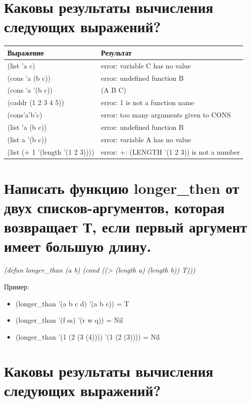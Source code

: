 \documentclass[a4paper,12pt]{article}
\begin{document}
	\section{Каковы результаты вычисления следующих выражений?}
	
	\begin{table} [h!]
		\begin{center}
			\begin{tabular}{|l|l|}
				\hline
				{\bf  Выражение} &    {\bf Результат} \\
				\hline
				{(list 'a c)} & error: variable C has no value\\
				\hline
				{(cons 'a (b c))} & error: undefined function B\\
				\hline
				{(cons 'a '(b c))} & (A B C)\\
				\hline
				{(caddr (1 2 3 4 5))} & error: 1 is not a function name\\
				\hline
				{(cons'a'b'c)} & error: too many arguments given to CONS\\
				\hline
				{(list 'a (b c))} & error: undefined function B \\
				\hline
				{(list a '(b c))} & error: variable A has no value\\
				\hline
				{(list (+ 1 '(length '(1 2 3))))} & error: +: (LENGTH '(1 2 3)) is not a number \\
				\hline
			\end{tabular}
			\label{m1}
		\end{center}
	\end{table}
	
	\section{Написать функцию longer\_then от двух списков-аргументов, которая возвращает Т, если первый аргумент имеет большую длину.}
	\textit{(defun longer\_than (a b) (cond ((> (length a) (length b)) T)))}
	
	Пример:
	\begin{itemize}
		\item (longer\_than '(a b c d) '(a b c)) = T
		\item (longer\_than '(f ss) '(r w q)) = Nil
		\item (longer\_than '(1 (2 (3 (4)))) '(1 (2 (3)))) = Nil
	\end{itemize}
	
	\section{Каковы результаты вычисления следующих выражений?}
	
\end{document}
